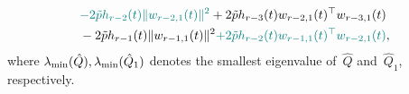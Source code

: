 \documentclass[ envcountsect, envcountsame]{svjour3}
\newcommand{\ddt}{\tfrac{\text{\normalfont d}}{\text{\normalfont d}t}}
\newcommand{\cP}{\mathcal{P}}
\def\green#1{\textcolor[rgb]{0.00,0.50,0.50}{#1}}
\begin{document}
\begin{equation}
\begin{aligned}
& \green{{- 2 \tilde p h_{r-2}(t) \|w_{r-2,1}(t)\|^2}} + 2 \tilde p h_{r-3}(t) w_{r-2,1}(t)^\top w_{r-3,1}(t)  \\
& - 2 \tilde p h_{r-1}(t) \|w_{r-1,1}(t)\|^2 \green{{+ 2 \tilde p h_{r-2}(t) w_{r-1,1}(t)^\top w_{r-2,1}(t) }} ,
%
%
%
\end{aligned}
\end{equation}
where $\lambda_{\rm min}(\hat Q), \lambda_{\rm min}(\hat Q_1)$ denotes the smallest eigenvalue of~$\hat Q$ and~$\hat Q_1$, respectively.
\end{document}
